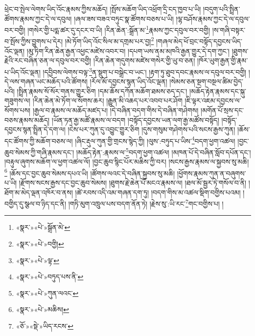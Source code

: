 ཕྲེང་བ་སྤེལ་ལེགས་ཡིད་འོང་རྣམས་ཀྱིས་མཆོད། །སྤོས་མཆོག་ཡིད་འཕྲོག་དྲི་ངད་ཁྱབ་པ་ཡི། །བདུག་པའི་སྤྲིན་ཚོགས་རྣམས་ཀྱང་དེ་ལ་དབུལ། །ཞལ་ཟས་བཟའ་བཏུང་སྣ་ཚོགས་བཅས་པ་ཡི། །ལྷ་བཤོས་རྣམས་ཀྱང་དེ་ལ་དབུལ་བར་བགྱི། །གསེར་གྱི་པདྨ་ཚར་དུ་དངར་བ་ཡི། །རིན་ཆེན་:སྒྲོན་མ་\footnote{«སྣར་»«པེ་»སྒྲོན་མེ་}རྣམས་ཀྱང་དབུལ་བར་བགྱི། །ས་གཞི་བསྟར་བ་སྤོས་ཀྱིས་བྱུགས་པ་དེར། །མེ་ཏོག་ཡིད་འོང་སིལ་མ་དགྲམ་པར་བྱ།\footnote{«སྣར་»«པེ་»བགྱི།} །གཞལ་མེད་ཕོ་བྲང་བསྟོད་དབྱངས་ཡིད་འོང་ལྡན། །མུ་ཏིག་རིན་ཆེན་རྒྱན་འཕྱང་མཛེས་འབར་བ། །དཔག་ཡས་ནམ་མཁའི་རྒྱན་གྱུར་དེ་དག་ཀྱང་། །ཐུགས་རྗེའི་རང་བཞིན་ཅན་ལ་དབུལ་བར་བགྱི། །རིན་ཆེན་གདུགས་མཛེས་གསེར་གྱི་ཡུ་བ་ཅན། །ཁོར་ཡུག་རྒྱན་གྱི་རྣམ་པ་ཡིད་འོང་ལྡན། །དབྱིབས་ལེགས་བལྟ་\footnote{«སྣར་»«པེ་»ལྟ་}ན་སྡུག་པ་བསྒྲེང་བ་ཡང་། །རྟག་ཏུ་ཐུབ་དབང་རྣམས་ལ་དབུལ་བར་བགྱི། །དེ་ལས་གཞན་ཡང་མཆོད་པའི་ཚོགས། །རོལ་མོ་དབྱངས་སྙན་ཡིད་འོང་ལྡན། །སེམས་ཅན་སྔག་བསྔལ་ཚིམ་བྱེད་པའི། །སྤྲིན་རྣམས་སོ་སོར་གནས་གྱུར་ཅིག །དམ་ཆོས་དཀོན་མཆོག་ཐམས་ཅད་དང་། །མཆོད་རྟེན་རྣམས་དང་སྐུ་གཟུགས་ལ། །རིན་ཆེན་མེ་ཏོག་ལ་སོགས་ཆར། །རྒྱུན་མི་འཆད་པར་འབབ་པར་ཤོག །ཇི་ལྟར་འཇམ་དབྱངས་ལ་སོགས་པས། །རྒྱལ་བ་རྣམས་ལ་མཆོད་མཛད་པ། །དེ་བཞིན་བདག་གིས་དེ་བཞིན་གཤེགས། །མགོན་པོ་སྲས་དང་བཅས་རྣམས་མཆོད། །ཡོན་ཏན་རྒྱ་མཚོ་རྣམས་ལ་བདག །བསྟོད་དབྱངས་ཡན་ལག་རྒྱ་མཚོས་བསྟོད། །བསྟོད་དབྱངས་སྙན་སྤྲིན་དེ་དག་ལ། །ངེས་པར་ཀུན་དུ་འབྱུང་གྱུར་ཅིག །དུས་གསུམ་གཤེགས་པའི་སངས་རྒྱས་ཀུན། །ཆོས་དང་ཚོགས་ཀྱི་མཆོག་བཅས་ལ། །ཞིང་རྡུལ་ཀུན་གྱི་གྲངས་སྙེད་ཀྱི། །ལུས་:བཏུད་པ་ཡིས་\footnote{«སྣར་»«པེ་»བཏུད་པས་ནི་}བདག་ཕྱག་འཚལ། །བྱང་ཆུབ་སེམས་ཀྱི་གཞི་རྣམས་དང་། །མཆོད་རྟེན་:རྣམས་ལ་\footnote{«སྣར་»«པེ་»ཀུན་ལའང་}བདག་ཕྱག་འཚལ། །མཁན་པོ་དེ་བཞིན་སློབ་དཔོན་དང་། །བརྟུལ་ཞུགས་མཆོག་ལ་ཕྱག་འཚལ་ལོ། །བྱང་ཆུབ་སྙིང་པོར་མཆིས་ཀྱི་བར། །སངས་རྒྱས་རྣམས་ལ་སྐྱབས་སུ་མཆི།\footnote{«སྣར་»«པེ་»མཆིས།} །ཆོས་དང་བྱང་ཆུབ་སེམས་དཔའ་ཡི། །ཚོགས་ལའང་དེ་བཞིན་སྐྱབས་སུ་མཆི། །ཕྱོགས་རྣམས་ཀུན་ན་བཞུགས་པ་ཡི། །རྫོགས་སངས་རྒྱས་དང་བྱང་ཆུབ་སེམས། །ཐུགས་རྗེ་ཆེན་པོ་མངའ་རྣམས་ལ། །ཐལ་མོ་སྦྱར་ཏེ་གསོལ་བ་ནི། །ཐོག་མ་མེད་ལྡན་འཁོར་བ་ནས། །ཚེ་རབས་འདི་འམ་གཞན་དག་ཏུ། །བདག་གིས་མ་འཚལ་སྡིག་བགྱིས་པའམ། །བགྱིད་དུ་སྩལ་བ་ཉིད་དང་ནི། །གཏི་མུག་འཁྲུལ་པས་བདག་ནོན་ཏེ། །རྗེས་སུ་:ཡི་རང་\footnote{«ཅོ་»«སྡེ་»ཡིད་རངས་}གང་བགྱིས་པ། །
